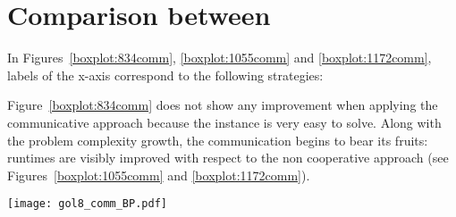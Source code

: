 \section{Comparison between \commstrs}

\begin{minipage}[c]{0.50\textwidth}
In Figures~\ref{boxplot:834comm}, \ref{boxplot:1055comm} and \ref{boxplot:1172comm}, labels of the x-axis correspond to the following strategies:


Figure~\ref{boxplot:834comm} does not show any improvement when applying the communicative approach because the instance is very easy to solve. Along with the problem complexity growth, the communication begins to bear its fruits: runtimes are visibly improved with respect to the non  cooperative approach (see Figures~\ref{boxplot:1055comm} and \ref{boxplot:1172comm}).
\end{minipage}\hspace{0.05\textwidth}
\begin{minipage}[c]{0.40\textwidth}
\centering
\texttt{[image: gol8\_comm\_BP.pdf]}
\label{boxplot:834comm}
\end{minipage}

